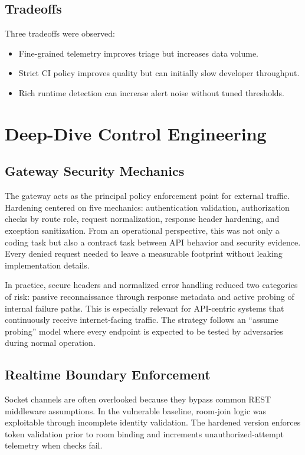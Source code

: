 \documentclass[conference]{IEEEtran}
\begin{document}
\subsection{Tradeoffs}
Three tradeoffs were observed:
\begin{itemize}
\item Fine-grained telemetry improves triage but increases data volume.
\item Strict CI policy improves quality but can initially slow developer throughput.
\item Rich runtime detection can increase alert noise without tuned thresholds.
\end{itemize}

\section{Deep-Dive Control Engineering}
\subsection{Gateway Security Mechanics}
The gateway acts as the principal policy enforcement point for external traffic. Hardening centered on five mechanics: authentication validation, authorization checks by route role, request normalization, response header hardening, and exception sanitization. From an operational perspective, this was not only a coding task but also a contract task between API behavior and security evidence. Every denied request needed to leave a measurable footprint without leaking implementation details.

In practice, secure headers and normalized error handling reduced two categories of risk: passive reconnaissance through response metadata and active probing of internal failure paths. This is especially relevant for API-centric systems that continuously receive internet-facing traffic. The strategy follows an ``assume probing'' model where every endpoint is expected to be tested by adversaries during normal operation.

\subsection{Realtime Boundary Enforcement}
Socket channels are often overlooked because they bypass common REST middleware assumptions. In the vulnerable baseline, room-join logic was exploitable through incomplete identity validation. The hardened version enforces token validation prior to room binding and increments unauthorized-attempt telemetry when checks fail.
\end{document}
